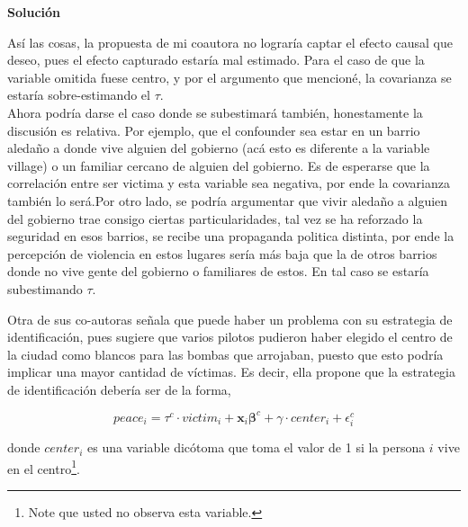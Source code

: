 \documentclass[a4paper, answers, addpoints, 11pt]{exam}
\newenvironment{solucion}{%
  \begin{mdframed}[
    backgroundcolor=blue!5,    %
    linecolor=blue!50,          %
    linewidth=2pt,              %
    leftmargin=10pt,            %
    rightmargin=10pt,           %
    topline=true,              %
    bottomline=true,            %
    roundcorner=10pt,           %
    innerleftmargin=10pt,       %
    innerrightmargin=10pt,      %
    innerbottommargin=10pt,     %
    innertopmargin=10pt         %
  ]%
  \begin{tcolorbox}[colframe=blue!50!black, colback=blue!50, coltitle=white, sharp corners=all, boxrule=1mm, width=\textwidth, halign=left, valign=center, top=0mm, bottom=0mm, left=0mm, right=0mm] \textbf{Solución} \end{tcolorbox} }{\end{mdframed}}
\begin{document}
\begin{enumerate}
\begin{solucion}
        Así las cosas, la propuesta de mi coautora no lograría captar el efecto causal que deseo, pues el efecto capturado estaría mal estimado. Para el caso de que la variable omitida fuese centro, y por el argumento que mencioné, la covarianza se estaría sobre-estimando el $\tau$.\\
        
        Ahora podría darse el caso donde se subestimará también, honestamente la discusión es relativa. Por ejemplo, que el confounder sea estar en un barrio aledaño a donde vive alguien del gobierno (acá esto es diferente a la variable village) o un familiar cercano de alguien del gobierno. Es de esperarse que la correlación entre ser victima y esta variable sea negativa, por ende la covarianza también lo será.Por otro lado, se podría argumentar que vivir aledaño a alguien del gobierno trae consigo ciertas particularidades, tal vez se ha reforzado la seguridad en esos barrios, se recibe una propaganda politica distinta, por ende la percepción de violencia en estos lugares sería más baja que la de otros barrios donde no vive gente del gobierno o familiares de estos. En tal caso se estaría subestimando $\tau$.
        \end{solucion}

    
\end{enumerate}

    Otra de sus co-autoras señala que puede haber un problema con su estrategia de identificación, pues sugiere que varios pilotos pudieron haber elegido el centro de la ciudad como blancos para las bombas que arrojaban, puesto que esto podría implicar una mayor cantidad de víctimas. Es decir, ella propone que la estrategia de identificación debería ser de la forma,

    \begin{equation}\label{eq:center}
        peace_i = \tau^{c} \cdot victim_i + \textbf{x}_i\boldsymbol\beta^{c} + \gamma \cdot center_i + \epsilon^{c}_i
    \end{equation}

    donde $center_i$ es una variable dicótoma que toma el valor de 1 si la persona $i$ vive en el centro\footnote{Note que usted no observa esta variable.}. 
\end{document}

